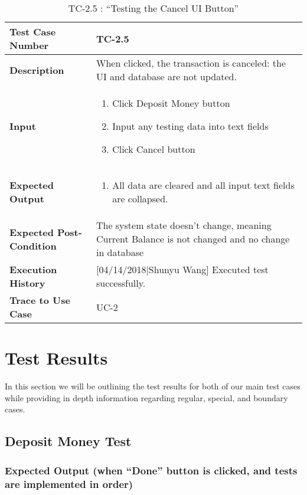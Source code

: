 \documentclass[12pt]{article}
\begin{document}
\begin{table}[H]
\caption{TC-2.5 : “Testing the Cancel UI Button”}
\begin{center}
\begin{tabular}{|p{5cm}|p{12cm}|}
\hline
\bf Test Case Number & 
TC-2.5 \\
\hline
\bf Description & 
When clicked, the transaction is canceled: the UI and database are not updated.\\
\hline
\bf Input & 
\begin{enumerate}
  \item Click Deposit Money button
  \item Input any testing data into text fields
  \item Click Cancel button
\end{enumerate} \\
\hline
\bf Expected Output & 
\begin{enumerate}
  \item All data are cleared and all input text fields are collapsed.
\end{enumerate} \\
\hline
\bf Expected Post-Condition & 
The system state doesn’t change, meaning Current Balance is not changed and no change in database\\
\hline
\bf Execution History & 
[04/14/2018|Shunyu Wang] Executed test successfully.\\
\hline
\bf Trace to Use Case & 
UC-2\\
\hline

\end{tabular}
\end{center}
\end{table}


\section{Test Results}

In this section we will be outlining the test results for both of our main test cases while providing in depth information regarding regular, special, and boundary cases. 

\subsection{Deposit Money Test}

\subsubsection{Expected Output (when ``Done'' button is clicked, and tests are implemented in order)}
\end{document}
